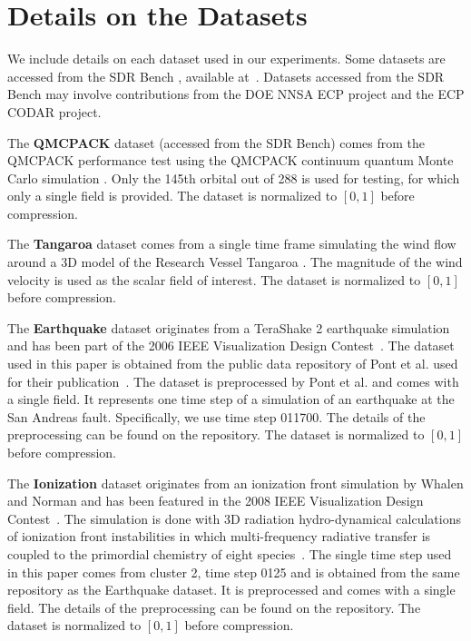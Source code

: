 \section{Details on the Datasets}
\label{sec:datasets}

We include details on each dataset used in our experiments. Some datasets are accessed from the SDR Bench \cite{zhao2020sdrbench}, available at~\cite{SDRBench}. Datasets accessed from the SDR Bench may involve contributions from the DOE NNSA ECP project and the ECP CODAR project.

The \textbf{QMCPACK} dataset (accessed from the SDR Bench) comes from the QMCPACK performance test using the QMCPACK continuum quantum Monte Carlo
simulation \cite{Kim_2018, Kent2020}. Only the 145th orbital out of 288 is used for testing, for which only a single field is provided. The dataset is normalized to $[0,1]$ before compression. 

The \textbf{Tangaroa} dataset comes from a single time frame simulating the wind flow around a 3D model of the Research Vessel Tangaroa \cite{popinet2004experimental}. 
The magnitude of the wind velocity is used as the scalar field of interest. The dataset is normalized to $[0,1]$ before compression.

The \textbf{Earthquake} dataset originates from a TeraShake 2 earthquake simulation~\cite{olsen2008terashake2} and has been part of the 2006 IEEE Visualization Design Contest~\cite{scivis2006}.  
The dataset used in this paper is obtained from the public data repository of Pont et al. used for their publication~\cite{pont2021wasserstein}. The dataset is preprocessed by Pont et al. and comes with a single field. It represents one time step of a simulation of an earthquake at the San Andreas fault. Specifically, we use time step 011700. The details of the preprocessing can be found on the repository. The dataset is normalized to $[0,1]$ before compression.

The \textbf{Ionization} dataset originates from an ionization front simulation by Whalen and Norman \cite{whalen2008ionization} and has been featured in the 2008 IEEE Visualization Design Contest~\cite{scivis2008}.   
The simulation is done with 3D radiation hydro-dynamical calculations of ionization front instabilities in which multi-frequency radiative transfer  is coupled to the primordial chemistry of eight species~\cite{whalen2008ionization}. 
The single time step used in this paper comes from cluster 2, time step 0125 and is obtained from the same repository as the Earthquake dataset. It is 
preprocessed and comes with a single field. The details of the preprocessing can be found on the repository. The dataset is normalized to $[0,1]$ before compression.

